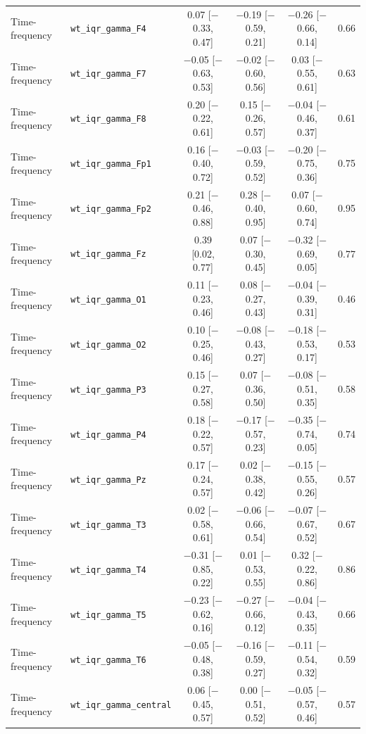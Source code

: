 {\begin{longtable}{llcccc}
Time-frequency & \texttt{wt\_iqr\_gamma\_F4} & 0.07 [$-$0.33, 0.47] & $-$0.19 [$-$0.59, 0.21] & $-$0.26 [$-$0.66, 0.14] & 0.66 \\
Time-frequency & \texttt{wt\_iqr\_gamma\_F7} & $-$0.05 [$-$0.63, 0.53] & $-$0.02 [$-$0.60, 0.56] & 0.03 [$-$0.55, 0.61] & 0.63 \\
Time-frequency & \texttt{wt\_iqr\_gamma\_F8} & 0.20 [$-$0.22, 0.61] & 0.15 [$-$0.26, 0.57] & $-$0.04 [$-$0.46, 0.37] & 0.61 \\
Time-frequency & \texttt{wt\_iqr\_gamma\_Fp1} & 0.16 [$-$0.40, 0.72] & $-$0.03 [$-$0.59, 0.52] & $-$0.20 [$-$0.75, 0.36] & 0.75 \\
Time-frequency & \texttt{wt\_iqr\_gamma\_Fp2} & 0.21 [$-$0.46, 0.88] & 0.28 [$-$0.40, 0.95] & 0.07 [$-$0.60, 0.74] & 0.95 \\
Time-frequency & \texttt{wt\_iqr\_gamma\_Fz} & 0.39 [0.02, 0.77] & 0.07 [$-$0.30, 0.45] & $-$0.32 [$-$0.69, 0.05] & 0.77 \\
Time-frequency & \texttt{wt\_iqr\_gamma\_O1} & 0.11 [$-$0.23, 0.46] & 0.08 [$-$0.27, 0.43] & $-$0.04 [$-$0.39, 0.31] & 0.46 \\
Time-frequency & \texttt{wt\_iqr\_gamma\_O2} & 0.10 [$-$0.25, 0.46] & $-$0.08 [$-$0.43, 0.27] & $-$0.18 [$-$0.53, 0.17] & 0.53 \\
Time-frequency & \texttt{wt\_iqr\_gamma\_P3} & 0.15 [$-$0.27, 0.58] & 0.07 [$-$0.36, 0.50] & $-$0.08 [$-$0.51, 0.35] & 0.58 \\
Time-frequency & \texttt{wt\_iqr\_gamma\_P4} & 0.18 [$-$0.22, 0.57] & $-$0.17 [$-$0.57, 0.23] & $-$0.35 [$-$0.74, 0.05] & 0.74 \\
Time-frequency & \texttt{wt\_iqr\_gamma\_Pz} & 0.17 [$-$0.24, 0.57] & 0.02 [$-$0.38, 0.42] & $-$0.15 [$-$0.55, 0.26] & 0.57 \\
Time-frequency & \texttt{wt\_iqr\_gamma\_T3} & 0.02 [$-$0.58, 0.61] & $-$0.06 [$-$0.66, 0.54] & $-$0.07 [$-$0.67, 0.52] & 0.67 \\
Time-frequency & \texttt{wt\_iqr\_gamma\_T4} & $-$0.31 [$-$0.85, 0.22] & 0.01 [$-$0.53, 0.55] & 0.32 [$-$0.22, 0.86] & 0.86 \\
Time-frequency & \texttt{wt\_iqr\_gamma\_T5} & $-$0.23 [$-$0.62, 0.16] & $-$0.27 [$-$0.66, 0.12] & $-$0.04 [$-$0.43, 0.35] & 0.66 \\
Time-frequency & \texttt{wt\_iqr\_gamma\_T6} & $-$0.05 [$-$0.48, 0.38] & $-$0.16 [$-$0.59, 0.27] & $-$0.11 [$-$0.54, 0.32] & 0.59 \\
Time-frequency & \texttt{wt\_iqr\_gamma\_central} & 0.06 [$-$0.45, 0.57] & 0.00 [$-$0.51, 0.52] & $-$0.05 [$-$0.57, 0.46] & 0.57 \\

\end{longtable}}
